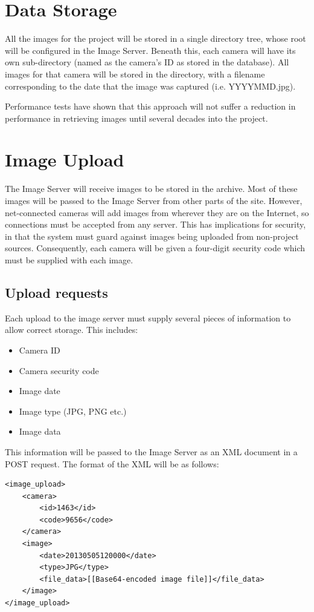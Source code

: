 \documentclass[11pt]{article}
\begin{document}
\section{Data Storage}
All the images for the project will be stored in a single directory tree, whose root will be configured in the Image Server. Beneath this, each camera will have its own sub-directory (named as the camera's ID as stored in the database). All images for that camera will be stored in the directory, with a filename corresponding to the date that the image was captured (i.e. YYYYMMD.jpg). 

Performance tests have shown that this approach will not suffer a reduction in performance in retrieving images until several decades into the project.

\section{Image Upload}
The Image Server will receive images to be stored in the archive. Most of these images will be passed to the Image Server from other parts of the site. However, net-connected cameras will add images from wherever they are on the Internet, so connections must be accepted from any server. This has implications for security, in that the system must guard against images being uploaded from non-project sources. Consequently, each camera will be given a four-digit security code which must be supplied with each image.

\subsection{Upload requests}
Each upload to the image server must supply several pieces of information to allow correct storage. This includes:

\begin{itemize}
\item Camera ID
\item Camera security code
\item Image date
\item Image type (JPG, PNG etc.)
\item Image data
\end{itemize}

This information will be passed to the Image Server as an XML document in a POST request. The format of the XML will be as follows:

\begin{verbatim}
<image_upload>
    <camera>
        <id>1463</id>
        <code>9656</code>
    </camera>
    <image>
        <date>20130505120000</date>
        <type>JPG</type>
        <file_data>[[Base64-encoded image file]]</file_data>
    </image>
</image_upload>
\end{verbatim}
\end{document}
